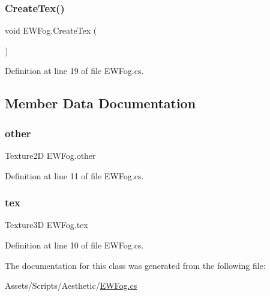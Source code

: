 \subsubsection{\texorpdfstring{Create\+Tex()}{CreateTex()}}
{\footnotesize\ttfamily void E\+W\+Fog.\+Create\+Tex (\begin{DoxyParamCaption}{ }\end{DoxyParamCaption})}



Definition at line 19 of file E\+W\+Fog.\+cs.



\subsection{Member Data Documentation}
\mbox{\label{class_e_w_fog_ada6e4e6a7b5060f00ca4c3ef3d87f484}} 
\subsubsection{\texorpdfstring{other}{other}}
{\footnotesize\ttfamily Texture2D E\+W\+Fog.\+other}



Definition at line 11 of file E\+W\+Fog.\+cs.

\mbox{\label{class_e_w_fog_a3465804803a9ad317a94d35158b65aff}} 
\subsubsection{\texorpdfstring{tex}{tex}}
{\footnotesize\ttfamily Texture3D E\+W\+Fog.\+tex}



Definition at line 10 of file E\+W\+Fog.\+cs.



The documentation for this class was generated from the following file\+:\begin{DoxyCompactItemize}
\item 
Assets/\+Scripts/\+Aesthetic/\mbox{\hyperlink{_e_w_fog_8cs}{E\+W\+Fog.\+cs}}\end{DoxyCompactItemize}
